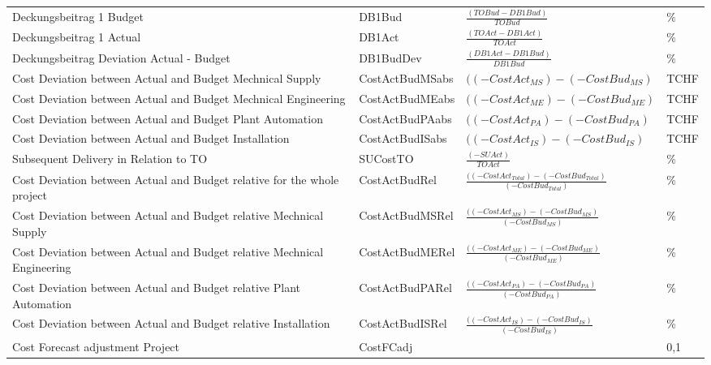 \begin{landscape}
\begin{center}
\begin{longtable}{p{6cm}|p{4cm}|p{6cm}|p{3cm}}
		Deckungsbeitrag 1 Budget & DB1Bud &  $\frac{(TOBud - DB1Bud)}{TOBud}$ & \multicolumn{1}{l}{\%} \\ [3mm]
		Deckungsbeitrag 1 Actual & DB1Act & $\frac{(TOAct - DB1Act)}{TOAct}$ & \multicolumn{1}{l}{\%} \\ [3mm]
		Deckungsbeitrag Deviation Actual - Budget & DB1BudDev &  $\frac{(DB1 Act-DB1 Bud)}{DB1 Bud}$     & \multicolumn{1}{l}{\%} \\ [3mm]
		Cost Deviation between Actual and Budget Mechnical Supply & CostActBudMSabs & $((-CostAct_{MS})-(-CostBud_{MS})$ & \multicolumn{1}{l}{TCHF} \\ [3mm]
		Cost Deviation between Actual and Budget Mechnical Engineering & CostActBudMEabs & $((-CostAct_{ME})-(-CostBud_{ME})$ & \multicolumn{1}{l}{TCHF} \\ [3mm]
		Cost Deviation between Actual and Budget Plant Automation & CostActBudPAabs & $((-CostAct_{PA})-(-CostBud_{PA})$ & \multicolumn{1}{l}{TCHF} \\ [3mm]
		Cost Deviation between Actual and Budget Installation & CostActBudISabs & $((-CostAct_{IS})-(-CostBud_{IS})$ & \multicolumn{1}{l}{TCHF} \\
		Subsequent Delivery in Relation to TO & SUCostTO & $\frac{(-SUAct)}{TOAct}$ & \multicolumn{1}{l}{\%} \\ [3mm]
		Cost Deviation between Actual and Budget relative for the whole project & CostActBudRel & $\frac{((-CostAct_{Total}) - (-CostBud_{Total})}{(-CostBud_{Total})}$ & \multicolumn{1}{l}{\%} \\ [3mm]
		Cost Deviation between Actual and Budget relative Mechnical Supply & CostActBudMSRel &  $\frac{((-CostAct_{MS}) - (-CostBud_{MS})}{(-CostBud_{MS})}$ & \multicolumn{1}{l}{\%} \\ [3mm]
		Cost Deviation between Actual and Budget relative Mechnical Engineering & CostActBudMERel & $\frac{((-CostAct_{ME}) - (-CostBud_{ME})}{(-CostBud_{ME})}$ & \multicolumn{1}{l}{\%} \\ [3mm]
		Cost Deviation between Actual and Budget relative Plant Automation & CostActBudPARel & $\frac{((-CostAct_{PA}) - (-CostBud_{PA})}{(-CostBud_{PA})}$ & \multicolumn{1}{l}{\%} \\ [3mm]
		Cost Deviation between Actual and Budget relative Installation & CostActBudISRel & $\frac{((-CostAct_{IS}) - (-CostBud_{IS})}{(-CostBud_{IS})}$ & \multicolumn{1}{l}{\%} \\ [3mm]
		Cost Forecast adjustment Project & CostFCadj &       & \multicolumn{1}{l}{{0,1}} \\

\end{longtable}
\end{center}
\end{landscape}
